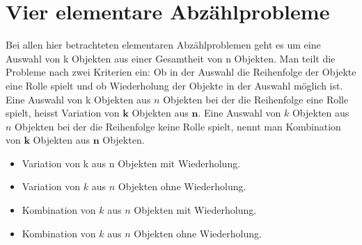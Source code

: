 \documentclass[10pt]{article}
\begin{document}
\section*{Vier elementare Abzählprobleme}
Bei allen hier betrachteten elementaren Abzählproblemen geht es um eine Auswahl von k Objekten aus einer Gesamtheit von n Objekten. Man teilt die Probleme nach zwei Kriterien ein: Ob in der Auswahl die Reihenfolge der Objekte eine Rolle spielt und ob Wiederholung der Objekte in der Auswahl möglich ist. Eine Auswahl von k Objekten aus $n$ Objekten bei der die Reihenfolge eine Rolle spielt, heisst Variation von $\mathbf{k}$ Objekten aus $\mathbf{n}$. Eine Auswahl von $k$ Objekten aus $n$ Objekten bei der die Reihenfolge keine Rolle spielt, nennt man Kombination von $\mathbf{k}$ Objekten aus $\mathbf{n}$ Objekten.

\begin{itemize}
  \item Variation von k aus n Objekten mit Wiederholung.
  \item Variation von $k$ aus $n$ Objekten ohne Wiederholung.
  \item Kombination von $k$ aus $n$ Objekten mit Wiederholung.
  \item Kombination von $k$ aus $n$ Objekten ohne Wiederholung.
\end{itemize}
\end{document}
